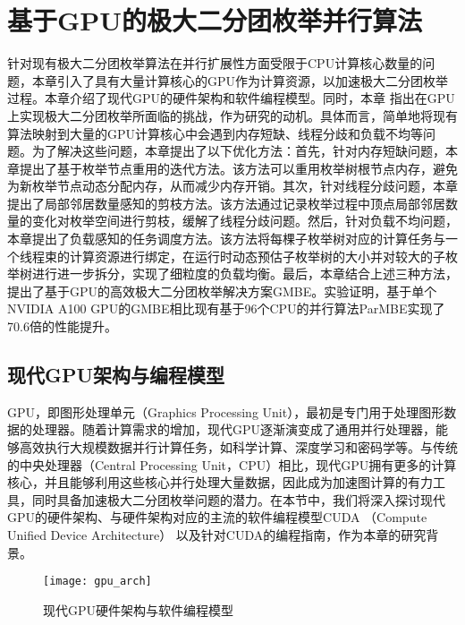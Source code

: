 \chapter{基于GPU的极大二分团枚举并行算法}
\label{ch:gmbe}

针对现有极大二分团枚举算法在并行扩展性方面受限于CPU计算核心数量的问题，本章引入了具有大量计算核心的GPU作为计算资源，以加速极大二分团枚举过程。本章介绍了现代GPU的硬件架构和软件编程模型。同时，本章%
指出在GPU上实现极大二分团枚举所面临的挑战，作为研究的动机。具体而言，简单地将现有算法映射到大量的GPU计算核心中会遇到内存短缺、线程分歧和负载不均等问题。为了解决这些问题，本章提出了以下优化方法：首先，针对内存短缺问题，本章提出了基于枚举节点重用的迭代方法。该方法可以重用枚举树根节点内存，避免为新枚举节点动态分配内存，从而减少内存开销。其次，针对线程分歧问题，本章提出了局部邻居数量感知的剪枝方法。该方法通过记录枚举过程中顶点局部邻居数量的变化对枚举空间进行剪枝，缓解了线程分歧问题。然后，针对负载不均问题，本章提出了负载感知的任务调度方法。该方法将每棵子枚举树对应的计算任务与一个线程束的计算资源进行绑定，在运行时动态预估子枚举树的大小并对较大的子枚举树进行进一步拆分，实现了细粒度的负载均衡。最后，本章结合上述三种方法，提出了基于GPU的高效极大二分团枚举解决方案GMBE。实验证明，基于单个NVIDIA A100 GPU的GMBE相比现有基于96个CPU的并行算法ParMBE实现了70.6倍的性能提升。

\section{现代GPU架构与编程模型} 
\label{sec:gpu_arch}
GPU，即图形处理单元（Graphics Processing Unit），最初是专门用于处理图形数据的处理器。随着计算需求的增加，现代GPU逐渐演变成了通用并行处理器，能够高效执行大规模数据并行计算任务，如科学计算、深度学习和密码学等。与传统的中央处理器（Central Processing Unit，CPU）相比，现代GPU拥有更多的计算核心，并且能够利用这些核心并行处理大量数据，因此成为加速图计算的有力工具，同时具备加速极大二分团枚举问题的潜力。在本节中，我们将深入探讨现代GPU的硬件架构、与硬件架构对应的主流的软件编程模型CUDA （Compute Unified Device Architecture） 以及针对CUDA的编程指南，作为本章的研究背景。

\begin{figure} [t]
  \center
		\texttt{[image: gpu\_arch]}
     \vspace{-0.1in}
	\caption{现代GPU硬件架构与软件编程模型}
	\label{fig:gpu}
\end{figure}

